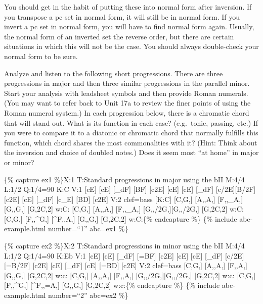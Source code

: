 \documentclass{book}
\begin{document}
You should get in the habit of putting these into normal form after inversion.
If you transpose a pc set in normal form, it will still be in normal form. If
you invert a pc set in normal form, you will have to find normal form again.
Usually, the normal form of an inverted set the reverse order, but there are
certain situations in which this will not be the case. You should always
double-check your normal form to be sure.

Analyze and listen to the following short progressions. There are three
progressions in major and then three similar progressions in the parallel
minor. Start your analysis with leadsheet symbols and then provide Roman
numerals. (You may want to refer back to Unit 17a to review the finer points
of using the Roman numeral system.) In each progression below, there is a
chromatic chord that will stand out. What is its function in each case?
(e.g.~tonic, passing, etc.) If you were to compare it to a diatonic or
chromatic chord that normally fulfills this function, which chord shares the
most commonalities with it? (Hint: Think about the inversion and choice of
doubled notes.) Does it seem most ``at home'' in major or minor?

\{\% capture ex1 \%\}X:1 T:Standard progressions in major using the bII M:4/4
L:1/2 Q:1/4=90 K:C V:1 {[}cE{]} {[}cE{]}\textbar{} {[}\_dF{]}
{[}BF{]}\textbar{} {[}c2E{]}\textbar{]} {[}cE{]} {[}cE{]}\textbar{} {[}\_dF{]}
{[}c/2E{]}{[}B/2F{]}\textbar{} {[}c2E{]}\textbar{]} {[}cE{]}
{[}\_dF{]}\textbar{} {[}c\_E{]} {[}BD{]}\textbar{} {[}c2E{]}\textbar{]} V:2
clef=bass {[}K:C{]} {[}C,G,{]} {[}A,,A,{]}\textbar{} {[}F,,\_A,{]}
{[}G,,G,{]}\textbar{} {[}G,2C,2{]}\textbar{]} w:C: {[}C,G,{]}
{[}A,,A,{]}\textbar{} {[}F,,\_A,{]} {[}G,,/2G,{]}{[}G,,/2G,{]}\textbar{}
{[}G,2C,2{]}\textbar{]} w:C: {[}C,G,{]} {[}F,,\^{}G,{]}\textbar{}
{[}\^{}F,,A,{]} {[}G,,G,{]}\textbar{} {[}G,2C,2{]}\textbar{]} w:C:\{\%
endcapture \%\} \{\% include abc-example.html number=``1'' abc=ex1 \%\}

\{\% capture ex2 \%\}X:2 T:Standard progressions in minor using the bII M:4/4
L:1/2 Q:1/4=90 K:Eb V:1 {[}cE{]} {[}cE{]}\textbar{} {[}\_dF{]}
{[}=BF{]}\textbar{} {[}c2E{]}\textbar{]} {[}cE{]} {[}cE{]}\textbar{}
{[}\_dF{]} {[}c/2E{]}{[}=B/2F{]}\textbar{} {[}c2E{]}\textbar{]} {[}cE{]}
{[}\_dF{]}\textbar{} {[}cE{]} {[}=BD{]}\textbar{} {[}c2E{]}\textbar{]} V:2
clef=bass {[}C,G,{]} {[}A,,A,{]}\textbar{} {[}F,,A,{]} {[}G,,G,{]}\textbar{}
{[}G,2C,2{]}\textbar{]} w:c: {[}C,G,{]} {[}A,,A,{]}\textbar{} {[}F,,A,{]}
{[}G,,/2G,{]}{[}G,,/2G,{]}\textbar{} {[}G,2C,2{]}\textbar{]} w:c: {[}C,G,{]}
{[}F,,\^{}G,{]}\textbar{} {[}\^{}F,,=A,{]} {[}G,,G,{]}\textbar{}
{[}G,2C,2{]}\textbar{]} w:c:\{\% endcapture \%\} \{\% include abc-example.html
number=``2'' abc=ex2 \%\}
\end{document}
